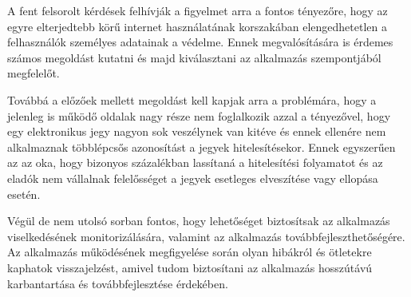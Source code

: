 A fent felsorolt kérdések felhívják a figyelmet arra a fontos tényezőre, hogy az egyre elterjedtebb körű internet használatának korszakában elengedhetetlen a felhasználók személyes adatainak a védelme. Ennek megvalósítására is érdemes számos megoldást kutatni és majd kiválasztani az alkalmazás szempontjából megfelelőt.

Továbbá a előzőek mellett megoldást kell kapjak arra a problémára, hogy a jelenleg is működő oldalak nagy része nem foglalkozik azzal a tényezővel, hogy egy elektronikus jegy nagyon sok veszélynek van kitéve és ennek ellenére nem alkalmaznak többlépcsős azonosítást a jegyek hitelesítésekor. Ennek egyszerűen az az oka, hogy bizonyos százalékban lassítaná a hitelesítési folyamatot és az eladók nem vállalnak felelősséget a jegyek esetleges elveszítése vagy ellopása esetén.

Végül de nem utolsó sorban fontos, hogy lehetőséget biztosítsak az alkalmazás viselkedésének monitorizálására, valamint az alkalmazás továbbfejleszthetőségére. Az alkalmazás működésének megfigyelése során olyan hibákról és ötletekre kaphatok visszajelzést, amivel tudom biztosítani az alkalmazás hosszútávú karbantartása és továbbfejlesztése érdekében.